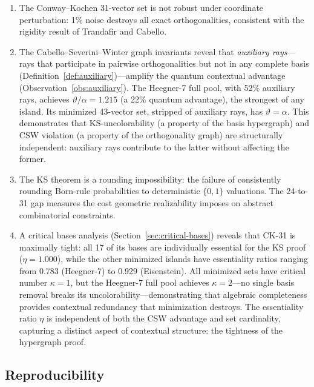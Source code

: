 \documentclass[12pt,a4paper]{article}
\begin{document}
\begin{enumerate}
    \item The Conway--Kochen 31-vector set is not robust under coordinate perturbation: 1\% noise destroys all exact orthogonalities, consistent with the rigidity result of Trandafir and Cabello.
    \item The Cabello--Severini--Winter graph invariants reveal that \emph{auxiliary rays}---rays that participate in pairwise orthogonalities but not in any complete basis (Definition~\ref{def:auxiliary})---amplify the quantum contextual advantage (Observation~\ref{obs:auxiliary}). The Heegner-7 full pool, with 52\% auxiliary rays, achieves $\vartheta/\alpha = 1.215$ (a 22\% quantum advantage), the strongest of any island. Its minimized 43-vector set, stripped of auxiliary rays, has $\vartheta = \alpha$. This demonstrates that KS-uncolorability (a property of the basis hypergraph) and CSW violation (a property of the orthogonality graph) are structurally independent: auxiliary rays contribute to the latter without affecting the former.
    \item The KS theorem is a rounding impossibility: the failure of consistently rounding Born-rule probabilities to deterministic $\{0, 1\}$ valuations. The 24-to-31 gap measures the cost geometric realizability imposes on abstract combinatorial constraints.
    \item A critical bases analysis (Section~\ref{sec:critical-bases}) reveals that CK-31 is maximally tight: all 17 of its bases are individually essential for the KS proof ($\eta = 1.000$), while the other minimized islands have essentiality ratios ranging from 0.783 (Heegner-7) to 0.929 (Eisenstein). All minimized sets have critical number $\kappa = 1$, but the Heegner-7 full pool achieves $\kappa = 2$---no single basis removal breaks its uncolorability---demonstrating that algebraic completeness provides contextual redundancy that minimization destroys. The essentiality ratio $\eta$ is independent of both the CSW advantage and set cardinality, capturing a distinct aspect of contextual structure: the tightness of the hypergraph proof.
\end{enumerate}

\subsection*{Reproducibility}
\end{document}
